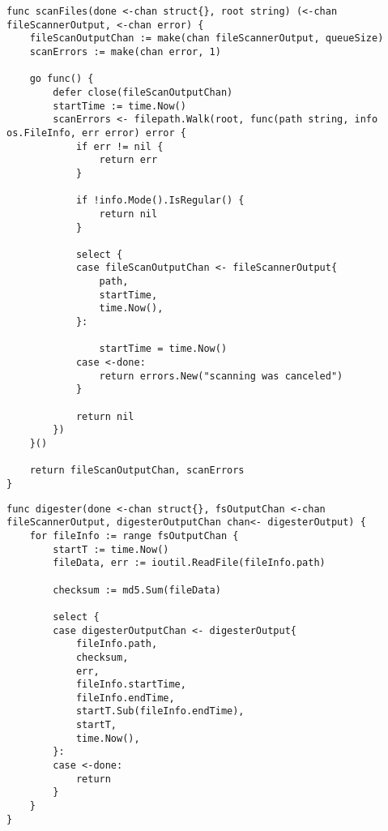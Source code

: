 \begin{lstlisting}[label=lst:fs,caption={Лента обхода файловой системы}]
func scanFiles(done <-chan struct{}, root string) (<-chan fileScannerOutput, <-chan error) {
	fileScanOutputChan := make(chan fileScannerOutput, queueSize)
	scanErrors := make(chan error, 1)

	go func() {
		defer close(fileScanOutputChan)
		startTime := time.Now()
		scanErrors <- filepath.Walk(root, func(path string, info os.FileInfo, err error) error {
			if err != nil {
				return err
			}

			if !info.Mode().IsRegular() {
				return nil
			}

			select {
			case fileScanOutputChan <- fileScannerOutput{
				path,
				startTime,
				time.Now(),
			}:

				startTime = time.Now()
			case <-done:
				return errors.New("scanning was canceled")
			}

			return nil
		})
	}()

	return fileScanOutputChan, scanErrors
}
\end{lstlisting}

\begin{lstlisting}[label=lst:dig,caption={Лента вычисления хеш-суммы}]
func digester(done <-chan struct{}, fsOutputChan <-chan fileScannerOutput, digesterOutputChan chan<- digesterOutput) {
    for fileInfo := range fsOutputChan {
        startT := time.Now()
        fileData, err := ioutil.ReadFile(fileInfo.path)

        checksum := md5.Sum(fileData)

        select {
        case digesterOutputChan <- digesterOutput{
            fileInfo.path,
            checksum,
            err,
            fileInfo.startTime,
            fileInfo.endTime,
            startT.Sub(fileInfo.endTime),
            startT,
            time.Now(),
        }:
        case <-done:
            return
        }
    }
}
\end{lstlisting}

